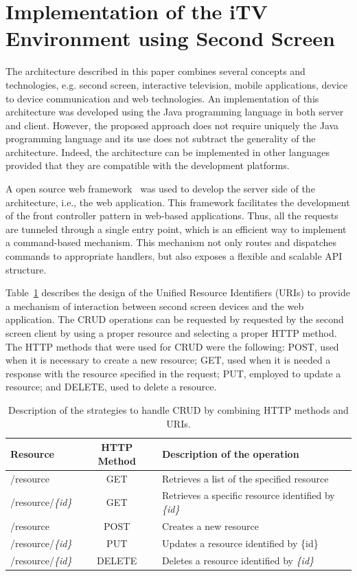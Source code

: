 \documentclass[journal]{IEEEtran}
\begin{document}
\section{Implementation of the iTV Environment using Second Screen}

The architecture described in this paper combines several concepts and technologies, e.g. second screen, interactive television, mobile applications, device to device communication and web technologies. An implementation of this architecture was developed using the Java programming language in both server and client. However, the proposed approach does not require uniquely the Java programming language and its use does not subtract the generality of the architecture. Indeed, the architecture can be implemented in other languages provided that they are compatible with the development platforms.

A open source web framework~\cite{Walls2011} was used to develop the server side of the architecture, i.e., the web application. This framework facilitates the development of the front controller pattern in web-based applications. Thus, all the requests are tunneled through a single entry point, which is an efficient way to implement a command-based mechanism. This mechanism not only routes and dispatches commands to appropriate handlers, but also exposes a flexible and scalable API structure.

Table~\ref{tab_web_services_design} describes the design of the Unified Resource Identifiers (URIs) to provide a mechanism of interaction between second screen devices and the web application. The CRUD operations can be requested by requested by the second screen client by using a proper resource and selecting a proper HTTP method. The HTTP methods that were used for CRUD were the following: POST, used when it is necessary to create a new resource; GET, used when it is needed a response with the resource specified in the request; PUT, employed to update a resource; and DELETE, used to delete a resource.

\begin{table}[!t]
	\label{tab_web_services_design}
	\renewcommand{\arraystretch}{1.3}
	\caption{Description of the strategies to handle CRUD by combining HTTP methods and URIs.}
	\centering
	\begin{tabular}{|l|c|p{3.5cm}|}
		\hline
		\bfseries Resource & \bfseries HTTP Method & \bfseries Description of the operation
		\tabularnewline\hline
		/resource & GET& Retrieves a list of the specified resource 
		\tabularnewline\hline
		/resource/\emph{\{id\}} & GET & Retrieves a specific resource identified by \emph{\{id\}}
		\tabularnewline\hline
		/resource & POST & Creates a new resource 
		\tabularnewline
		\hline
		/resource/\emph{\{id\}} & PUT & Updates a resource identified by \{id\}
		\tabularnewline
		\hline
		/resource/\emph{\{id\}} & DELETE & Deletes a resource identified by \emph{\{id\}}
		\tabularnewline
		\hline
	\end{tabular}
\end{table}
\end{document}
